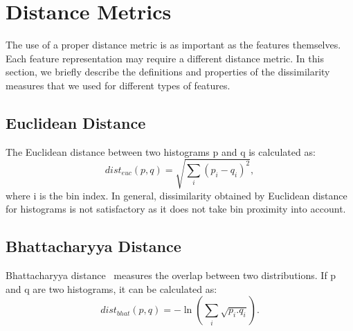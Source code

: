 \section{Distance Metrics}
The use of a proper distance metric is as important as the features themselves. Each feature representation
may require a different distance metric. In this section, we briefly describe the definitions and properties of the dissimilarity measures that we used for different types of features.
\subsection{Euclidean Distance}
The Euclidean distance between two histograms p and q is calculated as:
\begin{equation}
dist_{euc}(p,q) = \sqrt{\sum_i(p_i-q_i)^2},
\end{equation}
where i is the bin index. In general, dissimilarity obtained by Euclidean distance for histograms is not satisfactory as it does not take bin proximity into account.
\subsection{Bhattacharyya Distance}
Bhattacharyya distance~\cite{bhattacharyya1946measure} measures the overlap between two distributions. If p and q are two histograms, it can be calculated as:
\begin{equation}
dist_{bhat}(p,q) = -\ln \left( \sum_i \sqrt{p_i.q_i} \right).
\end{equation}

